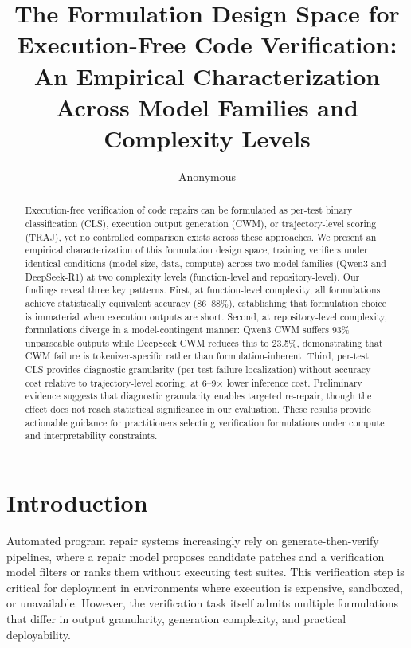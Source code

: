 \documentclass[11pt]{article}
\title{The Formulation Design Space for Execution-Free Code Verification:\\An Empirical Characterization Across Model Families and Complexity Levels}
\author{Anonymous}
\date{}
\begin{document}
\maketitle

\begin{abstract}

Execution-free verification of code repairs can be formulated as per-test binary classification (CLS), execution output generation (CWM), or trajectory-level scoring (TRAJ), yet no controlled comparison exists across these approaches. We present an empirical characterization of this formulation design space, training verifiers under identical conditions (model size, data, compute) across two model families (Qwen3 and DeepSeek-R1) at two complexity levels (function-level and repository-level). Our findings reveal three key patterns. First, at function-level complexity, all formulations achieve statistically equivalent accuracy (86--88\%), establishing that formulation choice is immaterial when execution outputs are short. Second, at repository-level complexity, formulations diverge in a model-contingent manner: Qwen3 CWM suffers 93\% unparseable outputs while DeepSeek CWM reduces this to 23.5\%, demonstrating that CWM failure is tokenizer-specific rather than formulation-inherent. Third, per-test CLS provides diagnostic granularity (per-test failure localization) without accuracy cost relative to trajectory-level scoring, at 6--9$\times$ lower inference cost. Preliminary evidence suggests that diagnostic granularity enables targeted re-repair, though the effect does not reach statistical significance in our evaluation. These results provide actionable guidance for practitioners selecting verification formulations under compute and interpretability constraints.

\end{abstract}

\section{Introduction}
\label{sec:intro}

Automated program repair systems increasingly rely on generate-then-verify pipelines, where a repair model proposes candidate patches and a verification model filters or ranks them without executing test suites. This verification step is critical for deployment in environments where execution is expensive, sandboxed, or unavailable. However, the verification task itself admits multiple formulations that differ in output granularity, generation complexity, and practical deployability.
\end{document}
